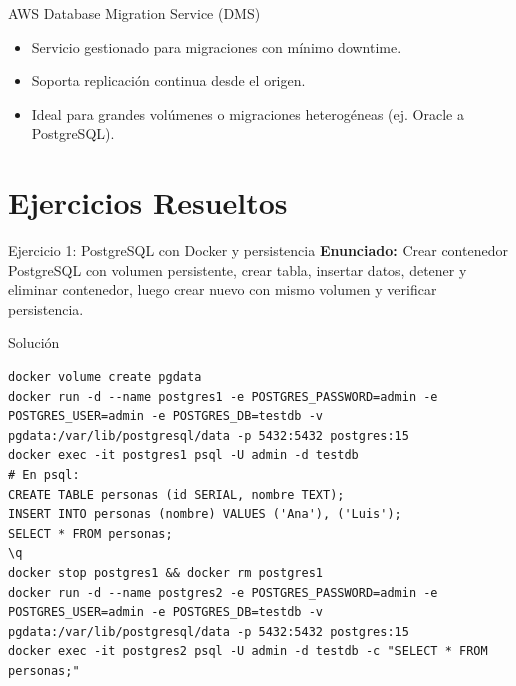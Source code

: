\documentclass[aspectratio=169, 10pt, xcolor=table]{beamer}
\begin{document}
\begin{frame}{AWS Database Migration Service (DMS)}
    \begin{itemize}
        \item Servicio gestionado para migraciones con mínimo downtime.
        \item Soporta replicación continua desde el origen.
        \item Ideal para grandes volúmenes o migraciones heterogéneas (ej. Oracle a PostgreSQL).
    \end{itemize}
\end{frame}

\section{Ejercicios Resueltos}

\begin{frame}[fragile]{Ejercicio 1: PostgreSQL con Docker y persistencia}
    \textbf{Enunciado:} Crear contenedor PostgreSQL con volumen persistente, crear tabla, insertar datos, detener y eliminar contenedor, luego crear nuevo con mismo volumen y verificar persistencia.
    \begin{block}{Solución}
        \begin{lstlisting}[style=bashstyle]
docker volume create pgdata
docker run -d --name postgres1 -e POSTGRES_PASSWORD=admin -e POSTGRES_USER=admin -e POSTGRES_DB=testdb -v pgdata:/var/lib/postgresql/data -p 5432:5432 postgres:15
docker exec -it postgres1 psql -U admin -d testdb
# En psql:
CREATE TABLE personas (id SERIAL, nombre TEXT);
INSERT INTO personas (nombre) VALUES ('Ana'), ('Luis');
SELECT * FROM personas;
\q
docker stop postgres1 && docker rm postgres1
docker run -d --name postgres2 -e POSTGRES_PASSWORD=admin -e POSTGRES_USER=admin -e POSTGRES_DB=testdb -v pgdata:/var/lib/postgresql/data -p 5432:5432 postgres:15
docker exec -it postgres2 psql -U admin -d testdb -c "SELECT * FROM personas;"
        \end{lstlisting}
    \end{block}
\end{frame}
\end{document}
